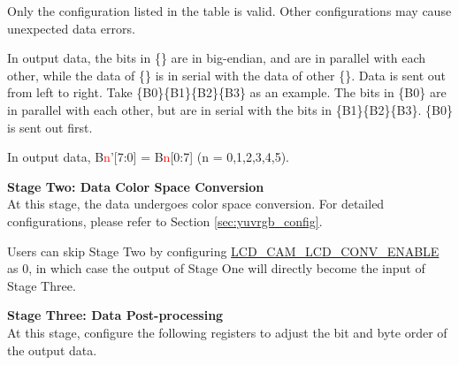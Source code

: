 \documentclass[main\_\_EN.tex]{subfiles}
\begin{document}
\begin{table}[H]
\begin{threeparttable}
\begin{tablenotes}
        \item[2] Only the configuration listed in the table is valid. Other configurations may cause unexpected data errors.
        \item[3] In output data, the bits in \{\} are in big-endian, and are in parallel with each other, while the data of \{\} is in serial with the data of other \{\}. Data is sent out from left to right. Take \{B0\}\{B1\}\{B2\}\{B3\} as an example. The bits in \{B0\} are in parallel with each other, but are in serial with the bits in \{B1\}\{B2\}\{B3\}. \{B0\} is sent out first.
        \item[4] In output data, B{\textcolor{red}{n}}'[7:0] = B{\textcolor{red}{n}}[0:7] (n = 0,1,2,3,4,5).
    \end{tablenotes}
    \end{threeparttable}
\end{table}

\textbf{Stage Two: Data Color Space Conversion}\\
At this stage, the data undergoes color space conversion. For detailed configurations, please refer to Section \ref{sec:yuvrgb_config}.

\begin{tiplisting}
Users can skip Stage Two by configuring \hyperref[fielddesc:LCDCAMLCDCONVENABLE]{LCD\_CAM\_LCD\_CONV\_ENABLE} as 0, in which case the output of Stage One will directly become the input of Stage Three.
\end{tiplisting}

\textbf{Stage Three: Data Post-processing}\\
At this stage, configure the following registers to adjust the bit and byte order of the output data.
\end{document}
